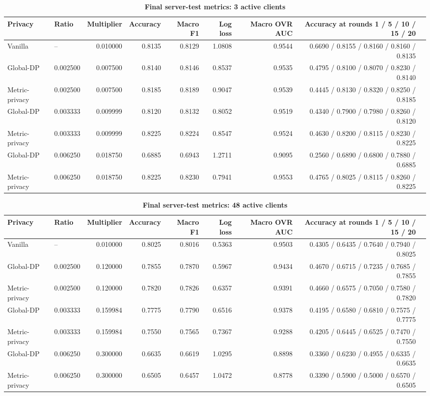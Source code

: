 \documentclass[10pt,a4paper,landscape]{article}
\begin{document}
\begin{table}[h]
\centering
\caption*{\bfseries Final server-test metrics: 3 active clients}
\scriptsize
\begin{tabular}{llrrrrrrl}
\toprule
Privacy & Ratio & Multiplier & Accuracy & Macro F1 & Log loss & Macro OVR AUC & Accuracy at rounds 1 / 5 / 10 / 15 / 20 \\
\midrule
Vanilla & -- & 0.010000 & 0.8135 & 0.8129 & 1.0808 & 0.9544 & 0.6690 / 0.8155 / 0.8160 / 0.8160 / 0.8135 \\
Global-DP & 0.002500 & 0.007500 & 0.8140 & 0.8146 & 0.8537 & 0.9535 & 0.4795 / 0.8100 / 0.8070 / 0.8230 / 0.8140 \\
Metric-privacy & 0.002500 & 0.007500 & 0.8185 & 0.8189 & 0.9047 & 0.9539 & 0.4445 / 0.8130 / 0.8320 / 0.8250 / 0.8185 \\
Global-DP & 0.003333 & 0.009999 & 0.8120 & 0.8132 & 0.8052 & 0.9519 & 0.4340 / 0.7900 / 0.7980 / 0.8260 / 0.8120 \\
Metric-privacy & 0.003333 & 0.009999 & 0.8225 & 0.8224 & 0.8547 & 0.9524 & 0.4630 / 0.8200 / 0.8115 / 0.8230 / 0.8225 \\
Global-DP & 0.006250 & 0.018750 & 0.6885 & 0.6943 & 1.2711 & 0.9095 & 0.2560 / 0.6890 / 0.6800 / 0.7880 / 0.6885 \\
Metric-privacy & 0.006250 & 0.018750 & 0.8225 & 0.8230 & 0.7941 & 0.9553 & 0.4765 / 0.8025 / 0.8115 / 0.8260 / 0.8225 \\
\bottomrule
\end{tabular}
\end{table}

\newpage
\begin{table}[h]
\centering
\caption*{\bfseries Final server-test metrics: 48 active clients}
\scriptsize
\begin{tabular}{llrrrrrrl}
\toprule
Privacy & Ratio & Multiplier & Accuracy & Macro F1 & Log loss & Macro OVR AUC & Accuracy at rounds 1 / 5 / 10 / 15 / 20 \\
\midrule
Vanilla & -- & 0.010000 & 0.8025 & 0.8016 & 0.5363 & 0.9503 & 0.4305 / 0.6435 / 0.7640 / 0.7940 / 0.8025 \\
Global-DP & 0.002500 & 0.120000 & 0.7855 & 0.7870 & 0.5967 & 0.9434 & 0.4670 / 0.6715 / 0.7235 / 0.7685 / 0.7855 \\
Metric-privacy & 0.002500 & 0.120000 & 0.7820 & 0.7826 & 0.6357 & 0.9391 & 0.4660 / 0.6575 / 0.7050 / 0.7580 / 0.7820 \\
Global-DP & 0.003333 & 0.159984 & 0.7775 & 0.7790 & 0.6516 & 0.9378 & 0.4195 / 0.6580 / 0.6810 / 0.7575 / 0.7775 \\
Metric-privacy & 0.003333 & 0.159984 & 0.7550 & 0.7565 & 0.7367 & 0.9288 & 0.4205 / 0.6445 / 0.6525 / 0.7470 / 0.7550 \\
Global-DP & 0.006250 & 0.300000 & 0.6635 & 0.6619 & 1.0295 & 0.8898 & 0.3360 / 0.6230 / 0.4955 / 0.6335 / 0.6635 \\
Metric-privacy & 0.006250 & 0.300000 & 0.6505 & 0.6457 & 1.0472 & 0.8778 & 0.3390 / 0.5900 / 0.5000 / 0.6570 / 0.6505 \\
\bottomrule
\end{tabular}
\end{table}
\end{document}
